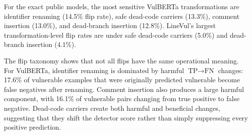 \documentclass[a4paper,fleqn]{cas-dc}
\begin{document}
\begin{table}[t]
  \centering
  \caption{Clean and transformed performance by detector.}
  \label{tab:rq1}
\end{table}

For the exact public models, the most sensitive VulBERTa transformations are
identifier renaming (14.5\% flip rate), safe dead-code carriers (13.3\%),
comment insertion (13.0\%), and dead-branch insertion (12.8\%). LineVul's
largest transformation-level flip rates are under safe dead-code carriers
(5.0\%) and dead-branch insertion (4.1\%).

The flip taxonomy shows that not all flips have the same operational meaning.
For VulBERTa, identifier renaming is dominated by harmful
$\text{TP}\rightarrow\text{FN}$ changes: 17.6\% of vulnerable examples that
were originally predicted vulnerable become false negatives after renaming.
Comment insertion also produces a large harmful component, with 16.1\% of
vulnerable pairs changing from true positive to false negative. Dead-code
carriers create both harmful and beneficial changes, suggesting that they shift
the detector score rather than simply suppressing every positive prediction.
\end{document}
